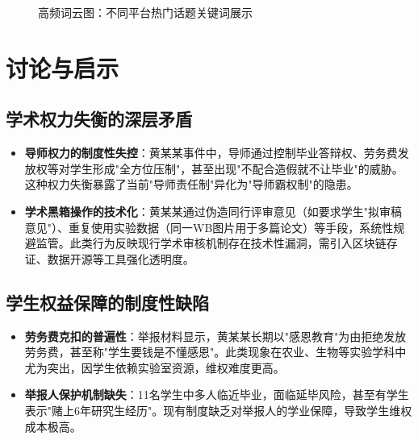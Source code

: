 \documentclass[12pt,a4paper]{article}
\begin{document}
\begin{figure}[htbp]
    \caption{高频词云图：不同平台热门话题关键词展示}
    \label{fig:wordcloud}
\end{figure}



\section{讨论与启示}
\subsection{学术权力失衡的深层矛盾}
\begin{itemize}[leftmargin=*]
    \item \textbf{导师权力的制度性失控}：黄某某事件中，导师通过控制毕业答辩权、劳务费发放权等对学生形成"全方位压制"，甚至出现"不配合造假就不让毕业"的威胁。这种权力失衡暴露了当前"导师责任制"异化为"导师霸权制"的隐患。
    \item \textbf{学术黑箱操作的技术化}：黄某某通过伪造同行评审意见（如要求学生"拟审稿意见"）、重复使用实验数据（同一WB图片用于多篇论文）等手段，系统性规避监管。此类行为反映现行学术审核机制存在技术性漏洞，需引入区块链存证、数据开源等工具强化透明度。
\end{itemize}

\subsection{学生权益保障的制度性缺陷}
\begin{itemize}[leftmargin=*]
    \item \textbf{劳务费克扣的普遍性}：举报材料显示，黄某某长期以"感恩教育"为由拒绝发放劳务费，甚至称"学生要钱是不懂感恩"。此类现象在农业、生物等实验学科中尤为突出，因学生依赖实验室资源，维权难度更高。
    \item \textbf{举报人保护机制缺失}：11名学生中多人临近毕业，面临延毕风险，甚至有学生表示"赌上6年研究生经历"。现有制度缺乏对举报人的学业保障，导致学生维权成本极高。
\end{itemize}
\end{document}
